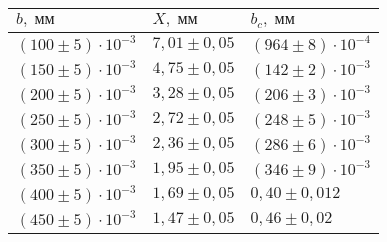 \begin{tabular}{|l|l|l|}
\hline
$b,\;\text{мм}$ & $X,\;\text{мм}$ & $b_c,\;\text{мм}$\\\hline
$\left(100 \pm 5\right)\cdot 10^{-3}$ & $7{,}01 \pm 0{,}05$ & $\left(964 \pm 8\right)\cdot 10^{-4}$\\\hline
$\left(150 \pm 5\right)\cdot 10^{-3}$ & $4{,}75 \pm 0{,}05$ & $\left(142 \pm 2\right)\cdot 10^{-3}$\\\hline
$\left(200 \pm 5\right)\cdot 10^{-3}$ & $3{,}28 \pm 0{,}05$ & $\left(206 \pm 3\right)\cdot 10^{-3}$\\\hline
$\left(250 \pm 5\right)\cdot 10^{-3}$ & $2{,}72 \pm 0{,}05$ & $\left(248 \pm 5\right)\cdot 10^{-3}$\\\hline
$\left(300 \pm 5\right)\cdot 10^{-3}$ & $2{,}36 \pm 0{,}05$ & $\left(286 \pm 6\right)\cdot 10^{-3}$\\\hline
$\left(350 \pm 5\right)\cdot 10^{-3}$ & $1{,}95 \pm 0{,}05$ & $\left(346 \pm 9\right)\cdot 10^{-3}$\\\hline
$\left(400 \pm 5\right)\cdot 10^{-3}$ & $1{,}69 \pm 0{,}05$ & $0{,}40 \pm 0{,}012$\\\hline
$\left(450 \pm 5\right)\cdot 10^{-3}$ & $1{,}47 \pm 0{,}05$ & $0{,}46 \pm 0{,}02$\\\hline
\end{tabular}
